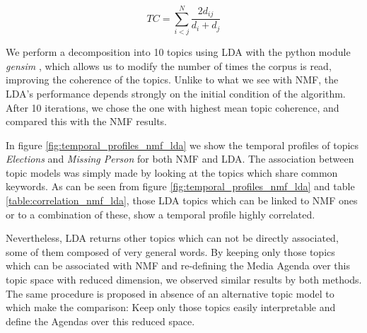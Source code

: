 \documentclass{bmcart}
\begin{document}
\begin{equation}
TC = \sum_{i < j}^N \frac{2d_{ij}}{d_i + d_j}
\label{eq:topic_coherence} 
\end{equation}

\par We perform a decomposition into 10 topics using LDA with the python module \emph{gensim} \cite{rehurek_lrec}, which allows us to modify the number of times the corpus is read, improving the coherence of the topics.
Unlike to what we see with NMF, the LDA's performance depends strongly on the initial condition of the algorithm. After 10 iterations, we chose the one with highest mean topic coherence, and compared this with the NMF results.

\par In figure \ref{fig:temporal_profiles_nmf_lda} we show the temporal profiles of topics \emph{Elections} and \emph{Missing Person} for both NMF and LDA. The association between topic models was simply made by looking at the topics which share common keywords.
As can be seen from figure \ref{fig:temporal_profiles_nmf_lda} and table \ref{table:correlation_nmf_lda}, those LDA topics which can be linked to NMF ones or to a combination of these, show a temporal profile highly correlated. 

\par Nevertheless, LDA returns other topics which can not be directly associated, some of them composed of very general words. 
By keeping only those topics which can be associated with NMF and re-defining the Media Agenda over this topic space with reduced dimension, we observed similar results by both methods.  
The same procedure is proposed in absence of an alternative topic model to which make the comparison: Keep only those topics easily interpretable and define the Agendas over this reduced space.
 


\end{document}
